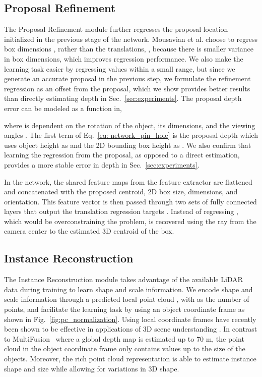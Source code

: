\documentclass[10pt,twocolumn,letterpaper]{article}
\begin{document}
	\subsection{Proposal Refinement}
	The Proposal Refinement module further regresses the proposal location initialized in the previous stage of the network. Mousavian et al. \cite{mousavian_deep3dbox} choose to regress box dimensions , rather than the translations, , because there is smaller variance in box dimensions, which improves regression performance. We also make the learning task easier by regressing values within a small range, but since we generate an accurate proposal in the previous step, we formulate the refinement regression as an offset from the proposal, which we show provides better results than directly estimating depth in Sec.~\ref{sec:experiments}. The proposal depth error can be modeled as a function  in,
	
	
where  is dependent on the rotation of the object, its dimensions, and the viewing angles . The first term of Eq.~\ref{eq: network_pin_hole} is the proposal depth  which uses object height  as  and the 2D bounding box height  as . We also confirm that learning the regression from the proposal, as opposed to a direct estimation, provides a more stable error in depth in Sec.~\ref{sec:experiments}.
	
	In the network, the shared feature maps from the feature extractor are flattened and concatenated with the proposed centroid, 2D box size, dimensions, and orientation. This feature vector is then passed through two sets of fully connected layers that output the translation regression targets . Instead of regressing , which would be overconstraining the problem,  is recovered using the ray from the camera center to the estimated 3D centroid of the box.
	
	\subsection{Instance Reconstruction} \label{sec:instance_reconstruction}
	The Instance Reconstruction module takes advantage of the available LiDAR data during training to learn shape and scale information. We encode shape and scale information through a predicted local point cloud , with  as the number of points, and facilitate the learning task by using an object coordinate frame as shown in Fig.~\ref{fig:pc_normalization}. Using local coordinate frames have recently been shown to be effective in applications of 3D scene understanding \cite{qi_fpointnet, rematas_soccer}. In contrast to MultiFusion~\cite{xu_multifusion} where a global depth map is estimated up to 70 m, the point cloud in the object coordinate frame only contains values up to the size of the objects. Moreover, the rich point cloud representation is able to estimate instance shape and size while allowing for variations in 3D shape.
	
\end{document}
